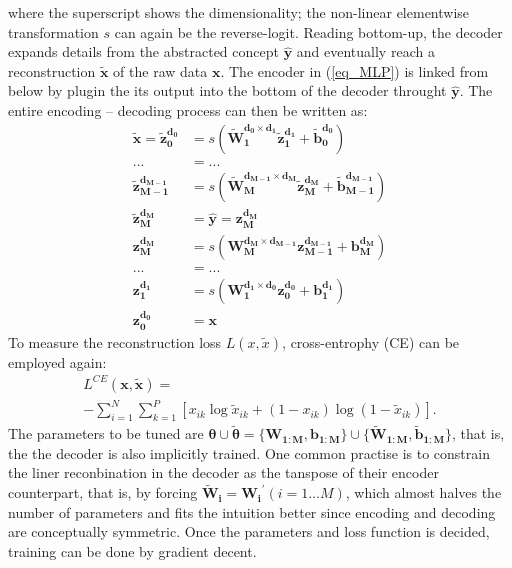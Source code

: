 \documentclass[twocolumn]{article}
\begin{document}
where the superscript shows the dimensionality; the non-linear elementwise transformation $s$ can again be the reverse-logit. Reading bottom-up, the decoder expands details from the abstracted concept ${\boldsymbol{\hat{y}}}$ and eventually reach a reconstruction $\boldsymbol{\tilde{x}}$ of the raw data  $\boldsymbol{x}$. The encoder in (\ref{eq_MLP}) is linked from below by plugin the its output into the bottom of the decoder throught ${\boldsymbol{\hat{y}}}$. The entire encoding -- decoding process can then be written as:
\begin{equation} \label{eq:encoder-decoder}
\begin{split}
  \boldsymbol{\tilde{x}}=
  \boldsymbol{\tilde{z}_{0  }^{d_{0  }}} &= s(\boldsymbol{\tilde{W}_{1  }^{d_{0  } \times d_{1  }} \tilde{z}_{1  }^{d_{1  }}}+\boldsymbol{\tilde{b}_{0  }^{d_{0  }}}) \\
  ... &= ... \\
  \boldsymbol{\tilde{z}_{M-1}^{d_{M-1}}} &= s(\boldsymbol{\tilde{W}_{M  }^{d_{M-1} \times d_{M  }} \tilde{z}_{M  }^{d_{M  }}}+\boldsymbol{\tilde{b}_{M-1}^{d_{M-1}}}) \\
  \boldsymbol{\tilde{z}_{M  }^{d_{M  }}} &= \boldsymbol{\hat{y}} = \boldsymbol{z_{M  }^{d_{M  }}} \\
  \boldsymbol{z_{M  }^{d_{M  }}}         &= s(\boldsymbol{W_{M  }^{d_{M  } \times d_{M-1}} z_{M-1}^{d_{M-1}}}+\boldsymbol{b_{M  }^{d_{M  }}}) \\
  ... &= ... \\
  \boldsymbol{z_{1  }^{d_{1  }}}         &= s(\boldsymbol{W_{1  }^{d_{1  } \times d_{0  }} z_{0  }^{d_{0  }}}+\boldsymbol{b_{1  }^{d_{1  }}}) \\
  \boldsymbol{z_{0  }^{d_{0  }}}         &= \boldsymbol{x}
\end{split}
\end{equation}
To measure the reconstruction loss $L(x,\tilde{x})$, cross-entrophy (CE) can be employed again:
\begin{equation*}
\begin{split}
  L^{CE}(\boldsymbol{x},\boldsymbol{\tilde{x}}) = \\
  -\sum_{i=1}^N\sum_{k=1}^P[x_{ik}\log{\tilde{x}_{ik}}+(1-x_{ik})\log(1-\tilde{x}_{ik})].
\end{split}
\end{equation*}
The parameters to be tuned are $\boldsymbol{\theta} \cup \boldsymbol{\tilde{\theta}}=\{\boldsymbol{W_{1:M}},\boldsymbol{b_{1:M}}\} \cup \{\boldsymbol{\tilde{W}_{1:M}}, \boldsymbol{\tilde{b}_{1:M}}\}$, that is, the the decoder is also implicitly trained. One common practise is to constrain the liner reconbination in the decoder as the tanspose of their encoder counterpart, that is, by forcing $\boldsymbol{\tilde{W}_i}=\boldsymbol{W_i}^{\prime} (i=1 \ldots M)$, which almost halves the number of parameters and fits the intuition better since encoding and decoding are conceptually symmetric. Once the parameters and loss function is decided, training can be done by gradient decent.
\end{document}
